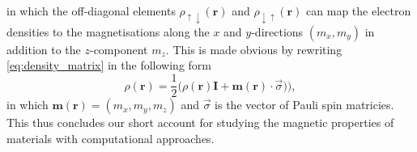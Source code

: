 in which the off-diagonal elements $\rho_{\uparrow\downarrow}(\bm{r})$ and $\rho_{\downarrow\uparrow}(\bm{r})$ can map the electron densities to the magnetisations along the $x$ and $y$-directions $(m_x,m_y)$ in addition to the $z$-component $m_z$. This is made obvious by rewriting \cref{eq:density_matrix} in the following form
\begin{equation}
    \rho(\bm{r})=\frac{1}{2}\bigg(\rho(\bm{r})\bm{I}+\bm{m}(\bm{r})\cdot\vec{\sigma})\bigg),
\end{equation}
in which $\bm{m}(\bm{r})=(m_x,m_y,m_z)$ and $\vec{\sigma}$ is the vector of Pauli spin matricies. This thus concludes our short account for studying the magnetic properties of materials with computational approaches.

